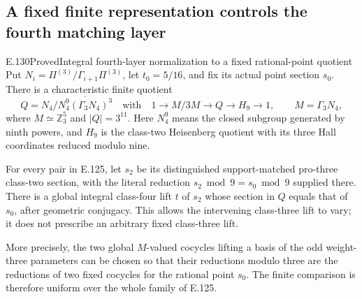 \subsection{A fixed finite representation controls the fourth matching layer}

\begin{result}{E.130}{Proved}{Integral fourth-layer normalization to a fixed rational-point quotient}
Put \(N_i=\Pi^{(3)}/\Gamma_{i+1}\Pi^{(3)}\), let
\(t_0=5/16\), and fix its actual point section \(s_0\).
There is a characteristic finite quotient
\[
 Q=N_4/\overline{N_4^9(\Gamma_3N_4)^3}
 \quad\text{with}\quad
 1\longrightarrow M/3M\longrightarrow Q
       \longrightarrow H_9\longrightarrow1,
 \qquad M=\Gamma_3N_4,
 \tag{E.130.1}
\]
where \(M\simeq\mathbb Z_3^5\) and \(|Q|=3^{11}\).
Here \(N_4^9\) means the closed subgroup generated by ninth
powers, and \(H_9\) is the class-two Heisenberg quotient with
its three Hall coordinates reduced modulo nine.

For every pair in E.125, let \(s_2\) be its distinguished
support-matched pro-three class-two section, with the
literal reduction \(s_2\bmod9=s_0\bmod9\) supplied there.
There is a global integral class-four lift \(t\) of \(s_2\)
whose section in \(Q\) equals that of \(s_0\), after geometric
conjugacy. This allows the intervening class-three lift to
vary; it does not prescribe an arbitrary fixed class-three
lift.

More precisely, the two global \(M\)-valued cocycles lifting
a basis of the odd weight-three parameters can be chosen
so that their reductions modulo three are the reductions
of two fixed cocycles for the rational point \(s_0\).
The finite comparison is therefore uniform over the whole
family of E.125.
\end{result}
